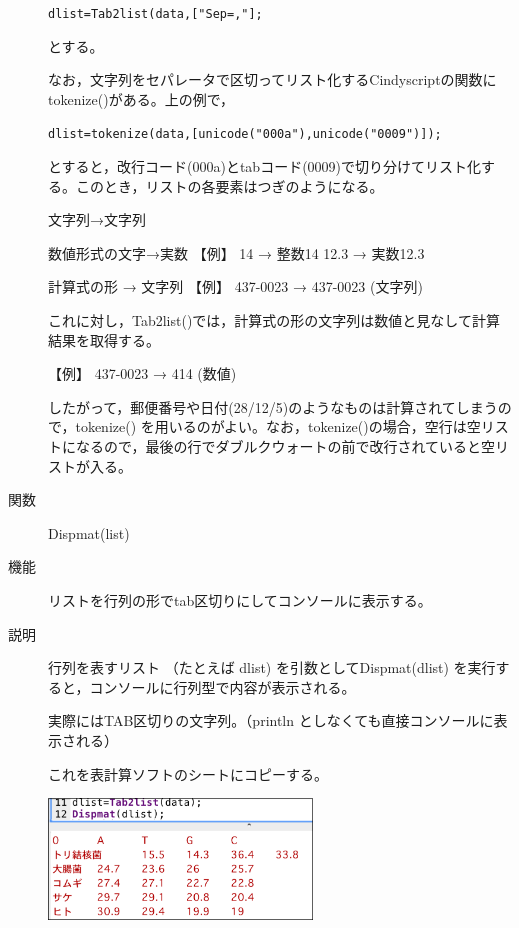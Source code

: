 \documentclass[papersize,a4paper,12pt,uplatex]{jsarticle}
\begin{document}
\begin{description}
\hspace{10mm}  \verb|dlist=Tab2list(data,["Sep=,"];|
  
とする。
 
なお，文字列をセパレータで区切ってリスト化するCindyscriptの関数に tokenize()がある。上の例で，

\hspace{10mm} \verb|dlist=tokenize(data,[unicode("000a"),unicode("0009")]);|
     
とすると，改行コード(000a)とtabコード(0009)で切り分けてリスト化する。このとき，リストの各要素はつぎのようになる。

文字列→文字列
  
数値形式の文字→実数    【例】 14 → 整数14    12.3 → 実数12.3

計算式の形  →  文字列  【例】 437-0023 →  437-0023 (文字列)

これに対し，Tab2list()では，計算式の形の文字列は数値と見なして計算結果を取得する。

\vspace{\baselineskip}
【例】 437-0023 →  414 (数値)

したがって，郵便番号や日付(28/12/5)のようなものは計算されてしまうので，tokenize() を用いるのがよい。なお，tokenize()の場合，空行は空リストになるので，最後の行でダブルクウォートの前で改行されていると空リストが入る。


\vspace{\baselineskip}
\hypertarget{dispmat}{}
\item[関数]  Dispmat(list)
\item[機能]  リストを行列の形でtab区切りにしてコンソールに表示する。
\item[説明]  行列を表すリスト （たとえば dlist) を引数としてDispmat(dlist) を実行すると，コンソールに行列型で内容が表示される。

実際にはTAB区切りの文字列。（println としなくても直接コンソールに表示される）

これを表計算ソフトのシートにコピーする。

\vspace{\baselineskip}
\hspace{10mm} \includegraphics[bb=0 0 427.52 197.51 , width=7cm]{Fig/tab2list04.pdf}



\end{description}
\end{document}

